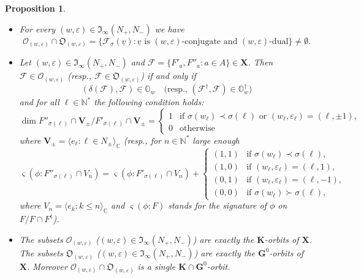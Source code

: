 \documentclass{amsart}
\newtheorem{proposition}{Proposition}
\theoremstyle{definition}
\newcommand{\NN}{\mathbb{N}^*}
\newcommand{\bs}[1]{\boldsymbol{#1}}
\begin{document}
\begin{proposition}
\label{P4.2-2}
\begin{itemize}
\item[\rm (a)] For every $(w,\varepsilon)\in\mathfrak{I}_\infty(N_+,N_-)$ we have
\[\bs{\mathcal{O}}_{(w,\varepsilon)}\cap\bs{\mathfrak{O}}_{(w,\varepsilon)}=\{\mathcal{F}_\sigma(\underline{v}):\mbox{$\underline{v}$ is $(w,\varepsilon)$-conjugate and $(w,\varepsilon)$-dual}\}\not=\emptyset.\]
\item[\rm (b)] Let $(w,\varepsilon)\in\mathfrak{I}_\infty(N_+,N_-)$
and $\mathcal{F}=\{F'_a,F''_a:a\in A\}\in\mathbf{X}$. Then
$\mathcal{F}\in\bs{\mathcal{O}}_{(w,\varepsilon)}$ (resp., $\mathcal{F}\in\bs{\mathfrak{O}}_{(w,\varepsilon)}$) if and only if
\[(\delta(\mathcal{F}),\mathcal{F})\in\pmb{\mathbb{O}}_w\quad\mbox{(resp., $(\mathcal{F}^\dag,\mathcal{F})\in\pmb{\mathbb{O}}_w^\dag$)}\]
and for all $\ell\in\mathbb{N}^*$ the following condition holds:
\[
\dim F''_{\sigma(\ell)}\cap \mathbf{V}_\pm/F'_{\sigma(\ell)}\cap \mathbf{V}_\pm
=
\left\{\begin{array}{ll}
1 & \mbox{if $\sigma(w_\ell)\prec\sigma(\ell)$ or $(w_\ell,\varepsilon_\ell)=(\ell,\pm1)$,} \\
0 & \mbox{otherwise}
\end{array}\right. 
\]
where $\mathbf{V}_\pm=\langle e_\ell:\ell\in N_\pm\rangle_\mathbb{C}$
(resp., for $n\in\NN$ large enough
\[
\varsigma(\phi:F''_{\sigma(\ell)}\cap V_n)=\varsigma(\phi:F'_{\sigma(\ell)}\cap V_n)+\left\{
\begin{array}{ll}
(1,1) & \mbox{if $\sigma(w_\ell)\prec\sigma(\ell)$,} \\
(1,0) & \mbox{if $(w_\ell,\varepsilon_\ell)=(\ell,1)$,} \\
(0,1) & \mbox{if $(w_\ell,\varepsilon_\ell)=(\ell,-1)$,} \\
(0,0) & \mbox{if $\sigma(w_\ell)\succ\sigma(\ell)$,}
\end{array}
\right.
\]
where 
$V_n=\langle e_k:k\leq n\rangle_\mathbb{C}$
and
$\varsigma(\phi:F)$ stands for the signature of $\phi$ on $F/F\cap F^\dag$).
\item[\rm (c)] The subsets $\bs{\mathcal{O}}_{(w,\varepsilon)}$ ($(w,\varepsilon)\in\mathfrak{I}_\infty(N_+,N_-)$) are exactly the $\mathbf{K}$-orbits of $\mathbf{X}$. The subsets $\bs{\mathfrak{O}}_{(w,\varepsilon)}$ ($(w,\varepsilon)\in\mathfrak{I}_\infty(N_+,N_-)$) are exactly the $\mathbf{G}^0$-orbits of $\mathbf{X}$.
Moreover $\bs{\mathcal{O}}_{(w,\varepsilon)}\cap\bs{\mathfrak{O}}_{(w,\varepsilon)}$ is a single $\mathbf{K}\cap\mathbf{G}^0$-orbit.
\end{itemize}
\end{proposition}
\end{document}

